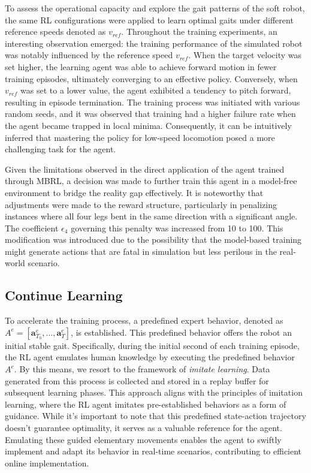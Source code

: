 To assess the operational capacity and explore the gait patterns of the soft robot, the same RL configurations were applied to learn optimal gaits under different reference speeds denoted as $v_{ref}$. Throughout the training experiments, an interesting observation emerged: the training performance of the simulated robot was notably influenced by the reference speed $v_{ref}$. When the target velocity was set higher, the learning agent was able to achieve forward motion in fewer training episodes, ultimately converging to an effective policy. Conversely, when $v_{ref}$ was set to a lower value, the agent exhibited a tendency to pitch forward, resulting in episode termination. The training process was initiated with various random seeds, and it was observed that training had a higher failure rate when the agent became trapped in local minima. Consequently, it can be intuitively inferred that mastering the policy for low-speed locomotion posed a more challenging task for the agent.

Given the limitations observed in the direct application of the agent trained through MBRL, a decision was made to further train this agent in a model-free environment to bridge the reality gap effectively. It is noteworthy that adjustments were made to the reward structure, particularly in penalizing instances where all four legs bent in the same direction with a significant angle. The coefficient $\epsilon_4$ governing this penalty was increased from 10 to 100. This modification was introduced due to the possibility that the model-based training might generate actions that are fatal in simulation but less perilous in the real-world scenario.

\subsection{Continue Learning}
To accelerate the training process, a predefined expert behavior, denoted as $A^e = [\textbf{a}_{T_0}^e, ..., \textbf{a}_T^e]$, is established\cite{jiSynthesizingOptimalGait2022}. This predefined behavior offers the robot an initial stable gait. Specifically, during the initial second of each training episode, the RL agent emulates human knowledge by executing the predefined behavior $A^e$. By this means, we resort to the framework of \textit{imitate learning}\cite{koberImitationReinforcementLearning2010}. Data generated from this process is collected and stored in a replay buffer for subsequent learning phases. This approach aligns with the principles of imitation learning, where the RL agent imitates pre-established behaviors as a form of guidance. While it's important to note that this predefined state-action trajectory doesn't guarantee optimality, it serves as a valuable reference for the agent. Emulating these guided elementary movements enables the agent to swiftly implement and adapt its behavior in real-time scenarios, contributing to efficient online implementation. 

